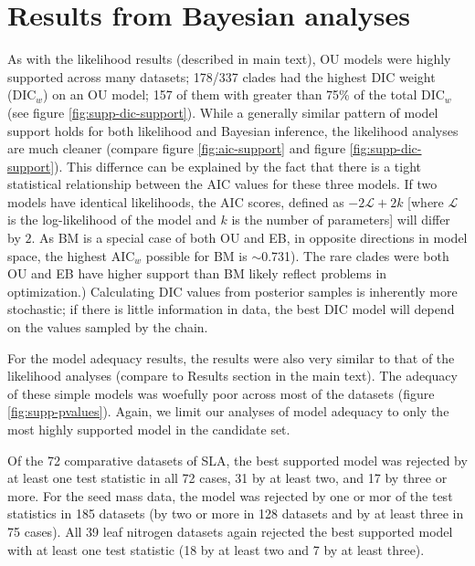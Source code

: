 \documentclass[a4paper,11pt]{article}
\begin{document}
\section{Results from Bayesian analyses}
As with the likelihood results (described in main text), OU models were highly supported across many datasets; 
178/337 clades had the highest DIC weight (DIC$_w$) on an OU model; 157 of them with greater than 75\% of the total DIC$_w$ (see figure \ref{fig:supp-dic-support}). While a generally similar pattern of model support holds for both likelihood and Bayesian inference, the likelihood analyses are much cleaner (compare figure \ref{fig:aic-support} and figure \ref{fig:supp-dic-support}). This differnce can be explained by the fact that there is a tight statistical relationship between the AIC values for these three models. If two models have identical likelihoods, the AIC scores, defined as $-2\mathcal{L} + 2k$ [where $\mathcal{L}$ is the log-likelihood of the model and $k$ is the number of parameters] will differ by $2$. As BM is a special case of both OU and EB, in opposite directions in model space, the highest AIC$_w$ possible for BM is $\sim$0.731). The rare clades were both OU and EB have higher support than BM likely reflect problems in optimization.) Calculating DIC values from posterior samples is inherently more stochastic; if there is little information in data, the best DIC model will depend on the values sampled by the chain. 

For the model adequacy results, the results were also very similar to that of the likelihood analyses (compare to Results section in the main text). The adequacy of these simple models was woefully poor across most of the datasets (figure \ref{fig:supp-pvalues}). Again, we limit our analyses of model adequacy to only the most highly supported model in the candidate set.

Of the 72 comparative datasets of SLA, the best supported model was rejected by at least one test statistic in all 72 cases, 31 by at least two, and 17 by three or more.
For the seed mass data, the model was rejected by one or mor of the test statistics in 185 datasets (by two or more in 128 datasets and by at least three in 75 cases).
All 39 leaf nitrogen datasets again rejected the best supported model with at least one test statistic (18 by at least two and 7 by at least three).
\end{document}
